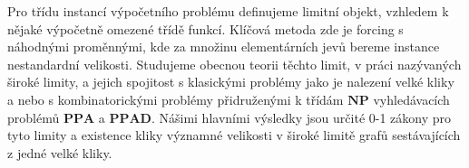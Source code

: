 \documentclass[12pt]{report}
\begin{document}

Pro třídu instancí výpočetního problému definujeme limitní objekt, vzhledem k nějaké výpočetně omezené třídě funkcí. Klíčová metoda zde je forcing s náhodnými proměnnými, kde za množinu elementárních jevů bereme instance nestandardní velikosti. Studujeme obecnou teorii těchto limit, v práci nazývaných široké limity, a jejich spojitost s klasickými problémy jako je nalezení velké kliky a nebo s kombinatorickými problémy přidruženými k třídám $\textbf{NP}$ vyhledávacích problémů $\textbf{PPA}$ a $\textbf{PPAD}$. Nášimi hlavními výsledky jsou určité 0-1 zákony pro tyto limity a existence kliky významné velikosti v široké limitě grafů sestávajících z jedné velké kliky.
\end{document}
